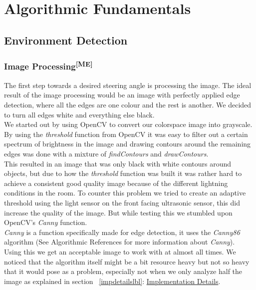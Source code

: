 \chapter{Algorithmic Fundamentals}
\section{Environment Detection}
\subsection[Image Processing]{Image Processing\textsuperscript{[ME]}}
The first step towards a desired steering angle is processing the image. The
ideal result of the image processing would be an image with perfectly applied
edge detection, where all the edges are one colour and the rest is another. We
decided to turn all edges white and everything else black.\\
We started out by using OpenCV to convert our colorspace image into grayscale.
By using the \textit{threshold} function from OpenCV it was easy to filter out a
certain spectrum of brightness in the image and drawing contours around the
remaining edges was done with a mixture of \textit{findContours} and
\textit{drawContours}.\\
This resulted in an image that was only black with white contours around
objects, but due to how the \textit{threshold} function was built it was rather
hard to achieve a consistent good quality image because of the different
lightning conditions in the room. To counter this problem we tried to create an
adaptive threshold using the light sensor on the front facing ultrasonic sensor,
this did increase the quality of the image. But while testing this we stumbled
upon OpenCV's \textit{Canny} function.\\

\noindent
\textit{Canny} is a function specifically made for edge detection, it uses the
\textit{Canny86} algorithm (See Algorithmic References for more information
about \textit{Canny}).\\
Using this we get an acceptable image to work with at almost all times. We
noticed that the algorithm itself might be a bit resource heavy but not so heavy
that it would pose as a problem, especially not when we only analyze half the
image as explained in section ~\ref{impdetailslbl}:
\hyperlink{impdetailstgt}{Implementation Details}.

